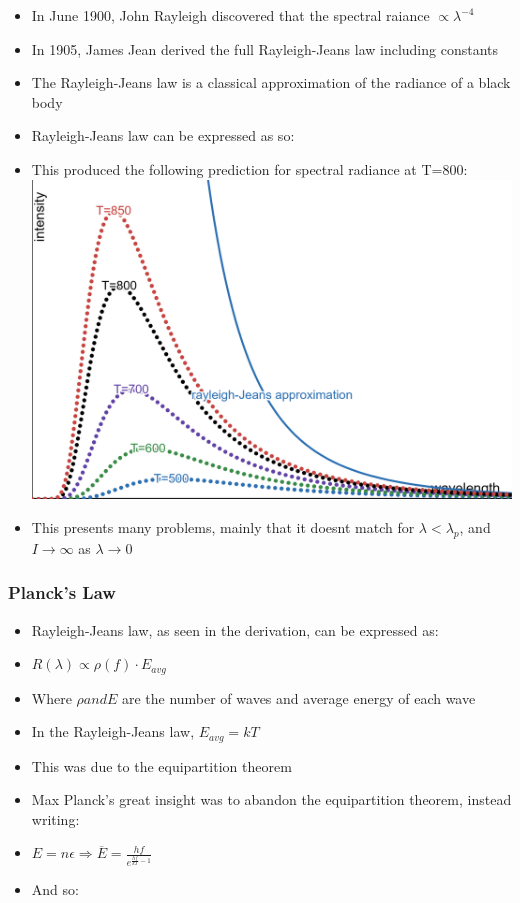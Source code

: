 \documentclass{article}
\begin{document}
\begin{itemize}
    \item In June 1900, John Rayleigh discovered that the spectral raiance \(\propto \lambda^{-4}\)
    \item In 1905, James Jean derived the full Rayleigh-Jeans law including constants
    \item The Rayleigh-Jeans law is a classical approximation of the radiance of a black body
    \item Rayleigh-Jeans law can be expressed as so:
    \item This produced the following prediction for spectral radiance at T=800:
    \includegraphics[width=.5\linewidth]{year1/wfmp/black body radiation/r-j-approximation.png}
    \item This presents many problems, mainly that it doesnt match for \(\lambda < \lambda_p\), and \(I\rightarrow\infty\) as \(\lambda\rightarrow 0\)
\end{itemize}

\subsubsection*{Planck's Law}

\begin{itemize}
    \item Rayleigh-Jeans law, as seen in the derivation, can be expressed as:
    \item \(R(\lambda)\propto\rho(f)\cdot E_{avg}\)
    \item Where \(\rho and E\) are the number of waves and average energy of each wave
    \item In the Rayleigh-Jeans law, \(E_{avg} = kT\)
    \item This was due to the equipartition theorem
    \item Max Planck's great insight was to abandon the equipartition theorem, instead writing:
    \item \(E=n\epsilon \Rightarrow \overline E = \frac{hf}{e^{\frac{hf}{kT}-1}}\) 
    \item And so:
\end{itemize}
\end{document}
